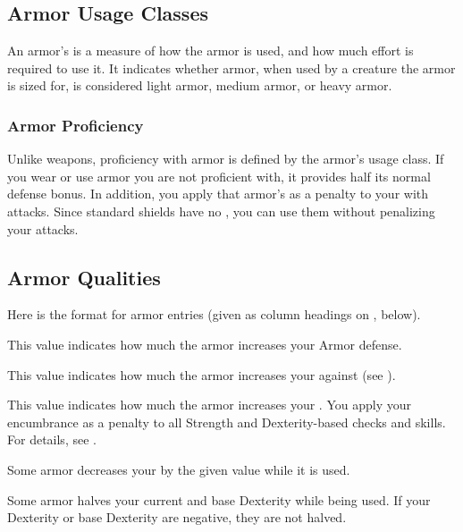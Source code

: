     \subsection{Armor Usage Classes}\label{Armor Usage Classes}
        An armor's  is a measure of how the armor is used, and how much effort is required to use it.
        It indicates whether armor, when used by a creature the armor is sized for, is considered light armor, medium armor, or heavy armor.

        \subsubsection{Armor Proficiency}\label{Armor Proficiency}
            Unlike weapons, proficiency with armor is defined by the armor's usage class.
            If you wear or use armor you are not proficient with, it provides half its normal defense bonus.
            In addition, you apply that armor's  as a penalty to your  with  attacks.
            Since standard shields have no , you can use them without penalizing your attacks.

    \subsection{Armor Qualities}
        \par Here is the format for armor entries (given as column headings on , below).

         This value indicates how much the armor increases your Armor defense.

         This value indicates how much the armor increases your  against  (see ).

         This value indicates how much the armor increases your .
        You apply your encumbrance as a penalty to all Strength and Dexterity-based checks and skills.
        For details, see .

         Some armor decreases your  by the given value while it is used.

         Some armor halves your current and base Dexterity while being used.
        If your Dexterity or base Dexterity are negative, they are not halved.

